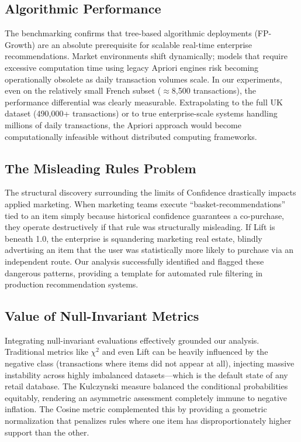 \documentclass[conference]{IEEEtran}
\begin{document}
\subsection{Algorithmic Performance}
The benchmarking confirms that tree-based algorithmic deployments (FP-Growth) are an absolute prerequisite for scalable real-time enterprise recommendations. Market environments shift dynamically; models that require excessive computation time using legacy Apriori engines risk becoming operationally obsolete as daily transaction volumes scale. In our experiments, even on the relatively small French subset ($\approx$8,500 transactions), the performance differential was clearly measurable. Extrapolating to the full UK dataset (490,000+ transactions) or to true enterprise-scale systems handling millions of daily transactions, the Apriori approach would become computationally infeasible without distributed computing frameworks.

\subsection{The Misleading Rules Problem}
The structural discovery surrounding the limits of Confidence drastically impacts applied marketing. When marketing teams execute ``basket-recommendations'' tied to an item simply because historical confidence guarantees a co-purchase, they operate destructively if that rule was structurally misleading. If Lift is beneath 1.0, the enterprise is squandering marketing real estate, blindly advertising an item that the user was statistically more likely to purchase via an independent route. Our analysis successfully identified and flagged these dangerous patterns, providing a template for automated rule filtering in production recommendation systems.

\subsection{Value of Null-Invariant Metrics}
Integrating null-invariant evaluations effectively grounded our analysis. Traditional metrics like $\chi^2$ and even Lift can be heavily influenced by the negative class (transactions where items did not appear at all), injecting massive instability across highly imbalanced datasets---which is the default state of any retail database. The Kulczynski measure balanced the conditional probabilities equitably, rendering an asymmetric assessment completely immune to negative inflation. The Cosine metric complemented this by providing a geometric normalization that penalizes rules where one item has disproportionately higher support than the other.
\end{document}
